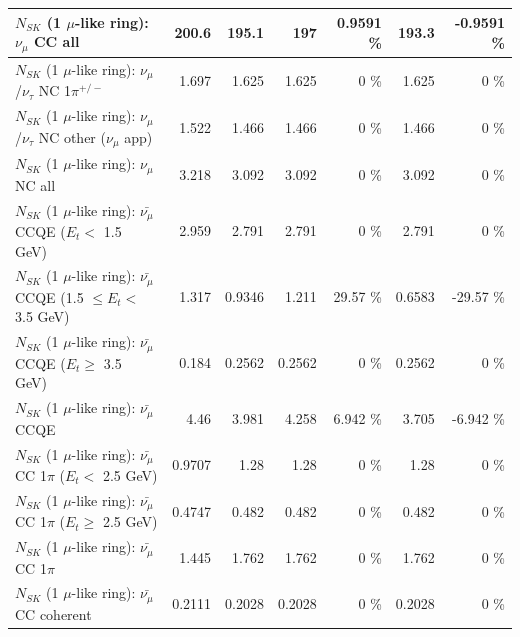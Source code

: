 \begin{table}
\begin{tabular}{| l | r | r | r  r | r  r |}
                                $N_{SK}$ (1 $\mu$-like ring): $\nu_{\mu}$ CC all &           200.6 &           195.1 &             197 &   0.9591 \%  &           193.3 &  -0.9591 \%  \\ 
\hline
              $N_{SK}$ (1 $\mu$-like ring): $\nu_\mu$/$\nu_\tau$ NC 1$\pi^{+/-}$ &           1.697 &           1.625 &           1.625 &        0 \%  &           1.625 &        0 \%  \\ 
     $N_{SK}$ (1 $\mu$-like ring): $\nu_\mu$/$\nu_\tau$ NC other ($\nu_\mu$ app) &           1.522 &           1.466 &           1.466 &        0 \%  &           1.466 &        0 \%  \\ 
                                $N_{SK}$ (1 $\mu$-like ring): $\nu_{\mu}$ NC all &           3.218 &           3.092 &           3.092 &        0 \%  &           3.092 &        0 \%  \\ 
\hline
\hline
\hline
          $N_{SK}$ (1 $\mu$-like ring): $\bar{\nu_\mu}$ CCQE ($E_{t} <$ 1.5 GeV) &           2.959 &           2.791 &           2.791 &        0 \%  &           2.791 &        0 \%  \\ 
 $N_{SK}$ (1 $\mu$-like ring): $\bar{\nu_\mu}$ CCQE (1.5 $\leq E_{t} <$ 3.5 GeV) &           1.317 &          0.9346 &           1.211 &    29.57 \%  &          0.6583 &   -29.57 \%  \\ 
       $N_{SK}$ (1 $\mu$-like ring): $\bar{\nu_\mu}$ CCQE ($E_{t} \geq$ 3.5 GeV) &           0.184 &          0.2562 &          0.2562 &        0 \%  &          0.2562 &        0 \%  \\ 
\hline
                              $N_{SK}$ (1 $\mu$-like ring): $\bar{\nu_\mu}$ CCQE &            4.46 &           3.981 &           4.258 &    6.942 \%  &           3.705 &   -6.942 \%  \\ 
\hline
     $N_{SK}$ (1 $\mu$-like ring): $\bar{\nu_\mu}$ CC 1$\pi$ ($E_{t} <$ 2.5 GeV) &          0.9707 &            1.28 &            1.28 &        0 \%  &            1.28 &        0 \%  \\ 
  $N_{SK}$ (1 $\mu$-like ring): $\bar{\nu_\mu}$ CC 1$\pi$ ($E_{t} \geq$ 2.5 GeV) &          0.4747 &           0.482 &           0.482 &        0 \%  &           0.482 &        0 \%  \\ 
\hline
                         $N_{SK}$ (1 $\mu$-like ring): $\bar{\nu_\mu}$ CC 1$\pi$ &           1.445 &           1.762 &           1.762 &        0 \%  &           1.762 &        0 \%  \\ 
                       $N_{SK}$ (1 $\mu$-like ring): $\bar{\nu_\mu}$ CC coherent &          0.2111 &          0.2028 &          0.2028 &        0 \%  &          0.2028 &        0 \%  \\ 

\end{tabular}
\end{table}
